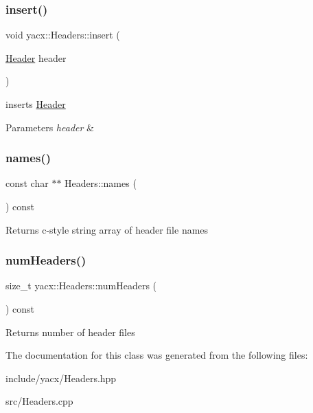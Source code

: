 \subsubsection{\texorpdfstring{insert()}{insert()}\hspace{0.1cm}{\footnotesize\ttfamily [2/2]}}
{\footnotesize\ttfamily void yacx\+::\+Headers\+::insert (\begin{DoxyParamCaption}\item[{\hyperlink{classyacx_1_1_header}{Header}}]{header }\end{DoxyParamCaption})\hspace{0.3cm}{\ttfamily [inline]}}

inserts \hyperlink{classyacx_1_1_header}{Header} 
\begin{DoxyParams}{Parameters}
{\em header} & \\
\hline
\end{DoxyParams}
\mbox{\label{classyacx_1_1_headers_aacf2017f07c4e9374a95facdf88863d7}} 
\subsubsection{\texorpdfstring{names()}{names()}}
{\footnotesize\ttfamily const char $\ast$$\ast$ Headers\+::names (\begin{DoxyParamCaption}{ }\end{DoxyParamCaption}) const}

\begin{DoxyReturn}{Returns}
c-\/style string array of header file names 
\end{DoxyReturn}
\mbox{\label{classyacx_1_1_headers_aed5718d17f7ab4e82b830708220fd00e}} 
\subsubsection{\texorpdfstring{num\+Headers()}{numHeaders()}}
{\footnotesize\ttfamily size\+\_\+t yacx\+::\+Headers\+::num\+Headers (\begin{DoxyParamCaption}{ }\end{DoxyParamCaption}) const\hspace{0.3cm}{\ttfamily [inline]}}

\begin{DoxyReturn}{Returns}
number of header files 
\end{DoxyReturn}


The documentation for this class was generated from the following files\+:\begin{DoxyCompactItemize}
\item 
include/yacx/Headers.\+hpp\item 
src/Headers.\+cpp\end{DoxyCompactItemize}
